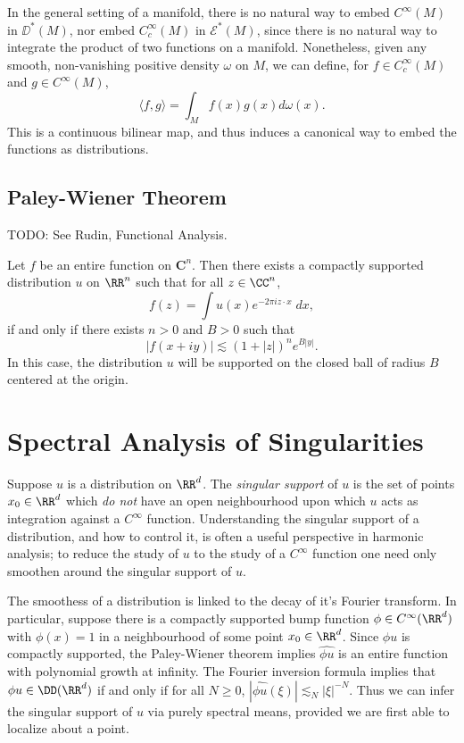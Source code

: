In the general setting of a manifold, there is no natural way to embed $C^\infty(M)$ in $\DD^*(M)$, nor embed $C_c^\infty(M)$ in $\mathcal{E}^*(M)$, since there is no natural way to integrate the product of two functions on a manifold. Nonetheless, given any smooth, non-vanishing positive density $\omega$ on $M$, we can define, for $f \in C_c^\infty(M)$ and $g \in C^\infty(M)$,
%
\[ \langle f, g \rangle = \int_M f(x) g(x) d\omega(x). \]
%
This is a continuous bilinear map, and thus induces a canonical way to embed the functions as distributions.

\section{Paley-Wiener Theorem}

TODO: See Rudin, Functional Analysis.

\begin{theorem}
    Let $f$ be an entire function on $\mathbf{C}^n$. Then there exists a compactly supported distribution $u$ on $\RR^n$ such that for all $z \in \CC^n$,
    \[ f(z) = \int u(x) e^{-2 \pi i z \cdot x}\; dx, \]
    if and only if there exists $n > 0$ and $B > 0$ such that
    \[ |f(x + i y)| \lesssim (1 + |z|)^n e^{B|y|}. \]
    In this case, the distribution $u$ will be supported on the closed ball of radius $B$ centered at the origin.
\end{theorem}







\chapter{Spectral Analysis of Singularities}

Suppose $u$ is a distribution on $\RR^d$. The \emph{singular support} of $u$ is the set of points $x_0 \in \RR^d$ which \emph{do not} have an open neighbourhood upon which $u$ acts as integration against a $C^\infty$ function. Understanding the singular support of a distribution, and how to control it, is often a useful perspective in harmonic analysis; to reduce the study of $u$ to the study of a $C^\infty$ function one need only smoothen around the singular support of $u$.

The smoothess of a distribution is linked to the decay of it's Fourier transform. In particular, suppose there is a compactly supported bump function $\phi \in C^\infty(\RR^d)$ with $\phi(x) = 1$ in a neighbourhood of some point $x_0 \in \RR^d$. Since $\phi u$ is compactly supported, the Paley-Wiener theorem implies $\widehat{\phi u}$ is an entire function with polynomial growth at infinity. The Fourier inversion formula implies that $\phi u \in \DD(\RR^d)$ if and only if for all $N \geq 0$, $|\widehat{\phi u}(\xi)| \lesssim_N |\xi|^{-N}$. Thus we can infer the singular support of $u$ via purely spectral means, provided we are first able to localize about a point.

